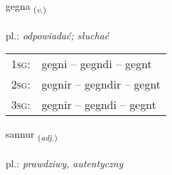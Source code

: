 \documentclass[frontgrid, backgrid]{flacards}\usepackage[]{graphicx}\usepackage[]{xcolor}
\begin{document}
\renewcommand{\flhead}{\vskip5pt \fboxsep=0pt {\small\bfseries\footnotesize Sagnorð | czasownik}}
\renewcommand{\fcfoot}{\vskip5pt \fboxsep=0pt \hspace{2pt}{\small\bfseries\footnotesize 1K}}

\renewcommand{\blhead}{\vskip5pt {\small\bfseries\footnotesize Sagnorð | czasownik }}
\renewcommand{\bcfoot}{\vskip5pt \hspace{2pt}{\small\bfseries\footnotesize 1K}}


{gegna \small{\textsubscript{(\textit{v.})}} \\[1ex] %
\textphonetic{[cɛkna]} \\
pl.: \emph{odpowiadać; słuchać} \\  [2ex]
\renewcommand*{\arraystretch}{0.8}
\begin{tabular}{p{1cm}l}
\textsc{1sg}: & gegni -- gegndi -- gegnt \\ 
\textsc{2sg}: & gegnir -- gegndir -- gegnt \\ 
\textsc{3sg}: & gegnir -- gegndi -- gegnt \\ 
\end{tabular}
}

\renewcommand{\flhead}{\vskip5pt \fboxsep=0pt {\small\bfseries\footnotesize Lýsingarorð | przymiotnik}}
\renewcommand{\fcfoot}{\vskip5pt \fboxsep=0pt \hspace{2pt}{\small\bfseries\footnotesize 1K}}

\renewcommand{\blhead}{\vskip5pt {\small\bfseries\footnotesize Lýsingarorð | przymiotnik }}
\renewcommand{\bcfoot}{\vskip5pt \hspace{2pt}{\small\bfseries\footnotesize 1K}}


{sannur \small{\textsubscript{(\textit{adj.})}} \\[1ex] %
\textphonetic{[sanʏr]} \\
pl.: \emph{prawdziwy, autentyczny} \\  [2ex]
\renewcommand*{\arraystretch}{0.8}
}
\end{document}
